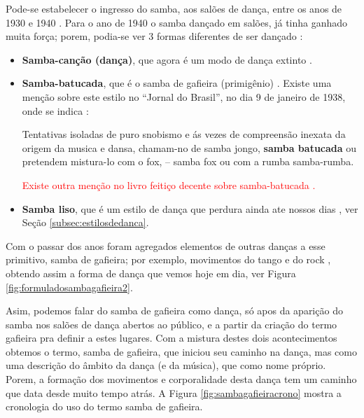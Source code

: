 Pode-se estabelecer o ingresso do samba, aos salões de dança, entre os anos de 1930 e 1940 \cite[pp. 140]{perna2002samba}.
Para o ano de 1940 o samba dançado em salões, já tinha ganhado muita força;
porem, podia-se ver 3 formas diferentes de ser dançado \cite[pp. 142-143]{perna2002samba}:
\begin{itemize}
\item \textbf{Samba-canção (dança)},
que agora é um modo de dança extinto \cite[pp. 143]{perna2002samba}.

\item \textbf{Samba-batucada},
que é o samba de gafieira (primigênio) \cite[pp. 143]{perna2002samba}.
Existe uma menção sobre este estilo no ``Jornal do Brasil'', no dia 9 de janeiro de 1938,
onde se indica \cite[pp. 4]{musicasambavariasdef1}:
\begin{citando}%
Tentativas isoladas de puro 
snobismo e ás vezes de compreensão 
inexata da origem da 
musica e dansa, chamam-no de samba jongo, \textbf{samba batucada} ou
pretendem mistura-lo com o fox, -- samba fox ou com a rumba samba-rumba.
\end{citando}

\textcolor{red}{Existe outra menção no livro feitiço decente sobre samba-batucada \cite[pp. 111]{sandroni2001feitico}.}

\item \textbf{Samba liso}, 
que é um estilo de dança que perdura ainda ate nossos dias \cite[pp. 143]{perna2002samba}, ver Seção \ref{subsec:estilosdedanca}.
\end{itemize}

Com o passar dos anos foram agregados elementos de outras danças a esse primitivo, samba de gafieira;
por exemplo, movimentos do tango e do rock \cite[pp. 142]{perna2002samba}, 
obtendo assim a forma de dança que vemos hoje em dia, ver Figura \ref{fig:formuladosambagafieira2}.

Asim, podemos falar do samba de gafieira como dança, só apos da aparição do samba nos
salões de dança abertos ao público, e a partir da criação do termo gafieira pra definir a estes lugares.
Com a mistura destes dois acontecimentos obtemos o termo, samba de gafieira,
que iniciou seu caminho na dança, mas como uma descrição do âmbito da dança (e da música), que como nome próprio.
Porem, a formação dos movimentos e corporalidade desta dança tem um caminho que data desde muito tempo atrás.
A Figura \ref{fig:sambagafieiracrono} mostra a cronologia do uso do termo samba de gafieira. 

